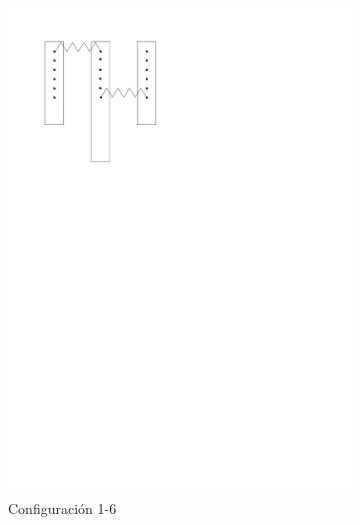 \begin{figure}[htbp!]
\begin{subfigure}[b]{0.3\textwidth}
		\includegraphics[width=\linewidth]{./Figures/16.pdf}
		\caption{Configuración 1-6}
		\label{fig:conf-1-6}
	\end{subfigure}
	\hfill
	\begin{subfigure}[b]{0.3\textwidth}
		\centering

\end{subfigure}
\end{figure}
